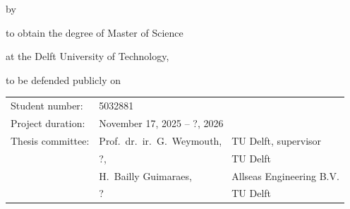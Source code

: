 \begin{titlepage}


\begin{center}


{\makeatletter
\largetitlestyle\fontsize{64}{94}\selectfont\@title
\makeatother}

{\makeatletter
\ifx\@subtitle\undefined\else
    \bigskip
   {\tudsffamily\fontsize{22}{32}\selectfont\@subtitle}    
\fi
\makeatother}

\bigskip
\bigskip

by

\bigskip
\bigskip

{\makeatletter
\largetitlestyle\fontsize{26}{26}\selectfont\@author
\makeatother}

\bigskip
\bigskip

to obtain the degree of Master of Science

at the Delft University of Technology,

to be defended publicly on 

\vfill

\begin{tabular}{lll}
    Student number: & 5032881 \\
    Project duration: & \multicolumn{2}{l}{November 17, 2025 -- ?, 2026} \\
    Thesis committee: & Prof.\ dr.\ ir.\ G.\ Weymouth, & TU Delft, supervisor \\
        & ?, & TU Delft \\
        & H.\ Bailly Guimaraes, & Allseas Engineering B.V. \\
        & ? & TU Delft\\ 
\end{tabular}

\bigskip
\bigskip


\end{center}
\end{titlepage}
